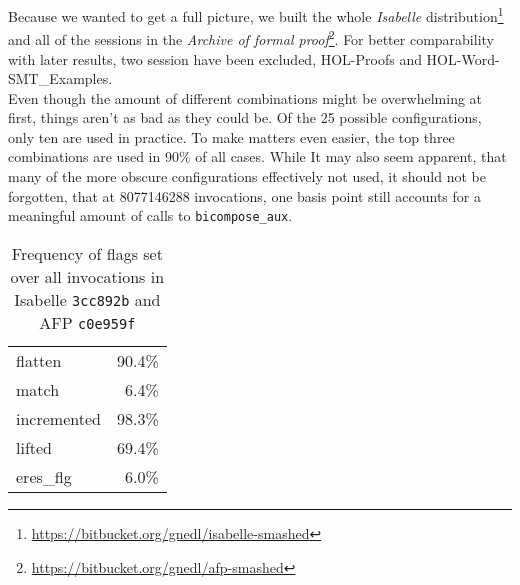 Because we wanted to get a full picture, we built the whole \textit{Isabelle} distribution\footnote{\url{https://bitbucket.org/gnedl/isabelle-smashed}} and all of the sessions in the \textit{Archive of formal proof}\footnote{\url{https://bitbucket.org/gnedl/afp-smashed}}. For better comparability with later results, two session have been excluded, HOL-Proofs and HOL-Word-SMT\_Examples.\\
Even though the amount of different combinations might be overwhelming at first, things aren't as bad as they could be. Of the 25 possible configurations, only ten are used in practice. To make matters even easier, the top three combinations are used in 90\% of all cases. While It may also seem apparent, that many of the more obscure configurations effectively not used, it should not be forgotten, that at 8077146288 invocations, one basis point still accounts for a meaningful amount of calls to \texttt{bicompose\_aux}.

\begin{table}[ht]
\caption{Frequency of flags set over all invocations in Isabelle \texttt{3cc892b} and AFP \texttt{c0e959f}}
\begin{tabular}{l r}
flatten & 90.4\%\\
match & 6.4\%\\
incremented & 98.3\%\\
lifted & 69.4\%\\
eres\_flg & 6.0\%
\end{tabular}
\label{tab:flag_freq}
\centering
\end{table}

